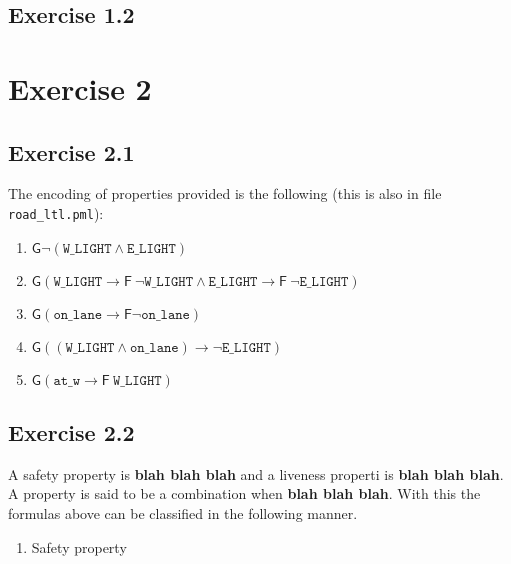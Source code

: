 \documentclass[12pt]{article}
\newcommand{\idea}[1]{\textcolor{darkyellow}{#1}}
\newcommand{\blah}{\textbf{blah blah blah}}
\begin{document}
\begin{enumerate}[label=\roman*.]
\subsection*{Exercise 1.2}


\section*{Exercise 2}

\subsection*{Exercise 2.1}

\idea{The encoding of properties provided is the following (this is also in file \texttt{road\_ltl.pml}):}

\begin{enumerate}[label=(\alph*)]
  \item $\mathsf{G}\neg(\texttt{W\_LIGHT} \wedge \texttt{E\_LIGHT})$

  \item $\mathsf{G}(\texttt{W\_LIGHT} \rightarrow \mathsf{F}~\neg\texttt{W\_LIGHT} \wedge \texttt{E\_LIGHT} \rightarrow \mathsf{F}~\neg\texttt{E\_LIGHT})$

  \item $\mathsf{G}(\texttt{on\_lane} \rightarrow \mathsf{F}\neg\texttt{on\_lane})$

  \item $\mathsf{G}((\texttt{W\_LIGHT} \wedge \texttt{on\_lane}) \rightarrow \neg\texttt{E\_LIGHT})$

  \item $\mathsf{G}(\texttt{at\_w} \rightarrow \mathsf{F}~\texttt{W\_LIGHT})$
\end{enumerate}

\subsection*{Exercise 2.2}

\idea{A safety property is \blah{} and a liveness properti is \blah{}.}
\idea{A property is said to be a combination when \blah{}.}
\idea{With this the formulas above can be classified in the following manner.}


\begin{enumerate}[label=(\alph*)]
  \item Safety property


\end{enumerate}
\end{enumerate}
\end{document}
